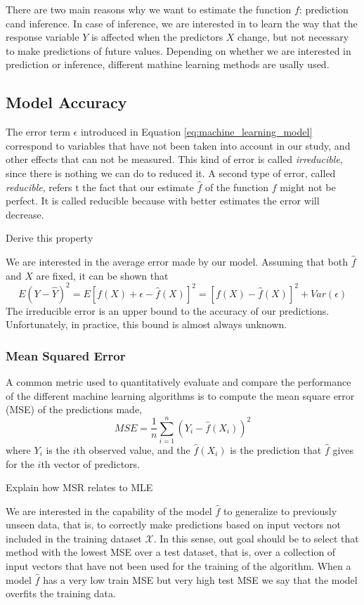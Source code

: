 There are two main reasons why we want to estimate the function $f$: prediction cand inference. In case of inference, we are interested in to learn the way that the response variable $Y$ is affected when the predictors $X$ change, but not necessary to make predictions of future values. Depending on whether we are interested in prediction or inference, different mathine learning methods are usally used.

\subsection{Model Accuracy}

The error term $\epsilon$ introduced in Equation \ref{eq:machine_learning_model} correspond to variables that have not been taken into account in our study, and other effects that can not be measured. This kind of error is called \emph{irreducible}, since there is nothing we can do to reduced it. A second type of error, called \emph{reducible}, refers t the fact that our estimate $\hat{f}$ of the function $f$ might not be perfect. It is called reducible because with better estimates the error will decrease.

    {\color{red} Derive this property}

We are interested in the average error made by our model. Assuming that both $\hat{f}$ and $X$ are fixed, it can be shown that
\[
    E\left(Y-\hat{Y}\right)^{2}=E\left[f\left(X\right)+\epsilon-\hat{f}\left(X\right)\right]^{2}=\left[f\left(X\right)-\hat{f}\left(X\right)\right]^{2}+Var\left(\epsilon\right)
\]
The irreducible error is an upper bound to the accuracy of our predictions. Unfortunately, in practice, this bound is almost always unknown.


\subsubsection{Mean Squared Error}

A common metric used to quantitatively evaluate and compare the performance of the different machine learning algorithms is to compute the mean square error (MSE) of the predictions made,
\[
    MSE = \frac{1}{n} \sum_{i=1}^n \left( Y_i - \hat{f}(X_i) \right) ^ 2
\]
where $Y_i$ is the $i$th observed value, and the $\hat{f}(X_i)$ is the prediction that $\hat{f}$ gives for the $i$th vector of predictors.

    {\color{red} Explain how MSR relates to MLE}

We are interested in the capability of the model $\hat{f}$ to generalize to previously unseen data, that is, to correctly make predictions based on input vectors not included in the training dataset $\mathcal{X}$. In this sense, out goal should be to select that method with the lowest MSE over a test dataset, that is, over a collection of input vectors that have not been used for the training of the algorithm. When a model $\hat{f}$ has a very low train MSE but very high test MSE we say that the model overfits the training data.

